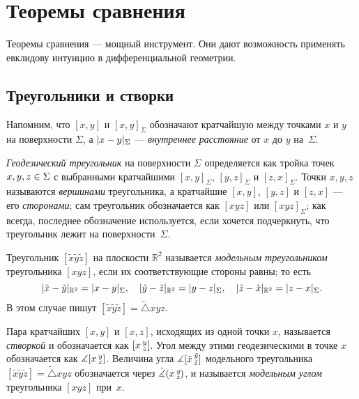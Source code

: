 \chapter{Теоремы сравнения}
\label{chap:comparison}

Теоремы сравнения --- мощный инструмент.
Они дают возможность применять евклидову интуицию в дифференциальной геометрии.

\section{Треугольники и створки}

Напомним, что $[x,y]$ и $[x,y]_\Sigma$ обозначают кратчайшую между точками $x$ и $y$ на поверхности $\Sigma$, а
$\dist{x}{y}\Sigma$ --- \emph{внутреннее расстояние} от $x$ до $y$ на~$\Sigma$.

\emph{Геодезический треугольник} на поверхности $\Sigma$ определяется как тройка точек $x,y,z\z\in \Sigma$ с выбранными кратчайшими $[x,y]_\Sigma$, $[y,z]_\Sigma$ и $[z,x]_\Sigma$.
Точки $x,y,z$ называются {}\emph{вершинами} треугольника,
а кратчайшие $[x,y]$, $[y,z]$ и $[z,x]$ --- его {}\emph{сторонами};
сам треугольник обозначается как $[xyz]$ или $[xyz]_\Sigma$;
как всегда, последнее обозначение используется, если хочется подчеркнуть, что треугольник лежит на поверхности~$\Sigma$.

Треугольник $[\tilde x\tilde y\tilde z]$ на плоскости $\mathbb{R}^2$ называется \emph{модельным треугольником} треугольника $[xyz]$,
если их соответствующие стороны равны;
то есть
\[\dist{\tilde x}{\tilde y}{\mathbb{R}^2}=\dist{x}{y}\Sigma,
\quad
\dist{\tilde y}{\tilde z}{\mathbb{R}^2}=\dist{y}{z}\Sigma,
\quad
\dist{\tilde z}{\tilde x}{\mathbb{R}^2}=\dist{z}{x}\Sigma.
\]
В этом случае пишут $[\tilde x\tilde y\tilde z]=\tilde\triangle xyz$.


Пара кратчайших $[x,y]$ и $[x,z]$, исходящих из одной точки $x$, называется \emph{створкой} и обозначается как $[x\,{}^{y}_{z}]$.
Угол между этими геодезическими в точке $x$ обозначается как $\measuredangle[x\,{}^{y}_{z}]$.
Величина угла $\measuredangle[\tilde x\,{}^{\tilde y}_{\tilde z}]$ модельного треугольника $[\tilde x\tilde y\tilde z]=\tilde\triangle xyz$ обозначается через $\tilde\measuredangle(x\,{}^{y}_{z}\hspace{-0.2ex})$,
и называется \emph{модельным углом} треугольника $[xyz]$ при~$x$.

